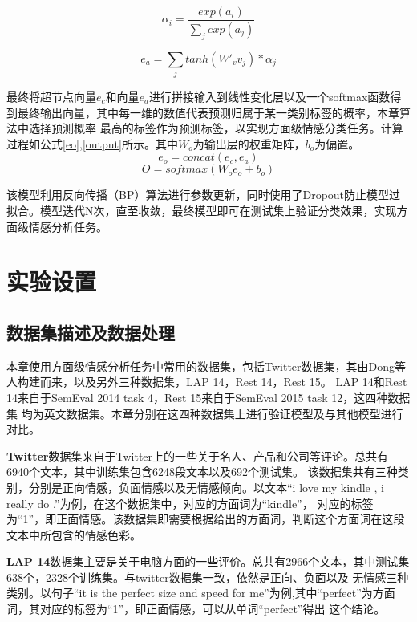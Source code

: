 \begin{equation}\label{a2}
    \alpha_i = \frac{exp(a_i)}{\sum_{j}exp(a_j)}
\end{equation}

\begin{equation}\label{a3}
    e_a = \sum_{j}tanh(W'_vv_j)* \alpha_j
\end{equation}

最终将超节点向量$e_c$和向量$e_a$进行拼接输入到线性变化层以及一个softmax函数得到最终输出向量，其中每一维的数值代表预测归属于某一类别标签的概率，本章算法中选择预测概率
最高的标签作为预测标签，以实现方面级情感分类任务。计算过程如公式\ref{eo},\ref{output}所示。其中$W_o$为输出层的权重矩阵，$b_o$为偏置。
\begin{equation}\label{eo}
    e_o = concat(e_c,e_a)
\end{equation}
\begin{equation}\label{output}
    O = softmax(W_oe_o+b_o)
\end{equation}

该模型利用反向传播（BP）算法进行参数更新，同时使用了Dropout防止模型过拟合。模型迭代N次，直至收敛，最终模型即可在测试集上验证分类效果，实现方面级情感分析任务。

\section{实验设置}
\subsection{数据集描述及数据处理}
本章使用方面级情感分析任务中常用的数据集，包括Twitter数据集，其由Dong等人构建而来，以及另外三种数据集，LAP 14，Rest 14，Rest 15。
LAP 14和Rest 14来自于SemEval 2014 task 4，Rest 15来自于SemEval 2015 task 12，这四种数据集
均为英文数据集。本章分别在这四种数据集上进行验证模型及与其他模型进行对比。

\textbf{Twitter}数据集来自于Twitter上的一些关于名人、产品和公司等评论。总共有6940个文本，其中训练集包含6248段文本以及692个测试集。
该数据集共有三种类别，分别是正向情感，负面情感以及无情感倾向。以文本“i love my kindle , i really do .”为例，在这个数据集中，对应的方面词为“kindle”，
对应的标签为“1”，即正面情感。该数据集即需要根据给出的方面词，判断这个方面词在这段文本中所包含的情感色彩。

\textbf{LAP 14}数据集主要是关于电脑方面的一些评价。总共有2966个文本，其中测试集638个，2328个训练集。与twitter数据集一致，依然是正向、负面以及
无情感三种类别。以句子“it is the perfect size and speed for me”为例,其中“perfect”为方面词，其对应的标签为“1”，即正面情感，可以从单词“perfect”得出
这个结论。

